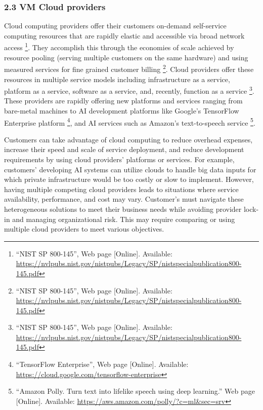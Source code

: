 \hypertarget{vm-cloud-providers}{%
\subsubsection{2.3 VM Cloud providers}\label{vm-cloud-providers}}

Cloud computing providers offer their customers on-demand self-service
computing resources that are rapidly elastic and accessible via broad
network access \footnote{``NIST SP 800-145'', Web page {[}Online{]}.
  Available:
  \url{https://nvlpubs.nist.gov/nistpubs/Legacy/SP/nistspecialpublication800-145.pdf}}.
They accomplish this through the economies of scale achieved by resource
pooling (serving multiple customers on the same hardware) and using
measured services for fine grained customer billing \footnote{``NIST SP
  800-145'', Web page {[}Online{]}. Available:
  \url{https://nvlpubs.nist.gov/nistpubs/Legacy/SP/nistspecialpublication800-145.pdf}}.
Cloud providers offer these resources in multiple service models
including infrastructure as a service, platform as a service, software
as a service, and, recently, function as a service \footnote{``NIST SP
  800-145'', Web page {[}Online{]}. Available:
  \url{https://nvlpubs.nist.gov/nistpubs/Legacy/SP/nistspecialpublication800-145.pdf}}.
These providers are rapidly offering new platforms and services ranging
from bare-metal machines to AI development platforms like Google's
TensorFlow Enterprise platform \footnote{``TensorFlow Enterprise'', Web
  page {[}Online{]}. Available:
  \url{https://cloud.google.com/tensorflow-enterprise}}, and AI services
such as Amazon's text-to-speech service \footnote{``Amazon Polly. Turn
  text into lifelike speech using deep learning.'' Web page
  {[}Online{]}. Available:
  \url{https://aws.amazon.com/polly/?c=ml\&sec=srv}}.

Customers can take advantage of cloud computing to reduce overhead
expenses, increase their speed and scale of service deployment, and
reduce development requirements by using cloud providers' platforms or
services. For example, customers' developing AI systems can utilize
clouds to handle big data inputs for which private infrastructure would
be too costly or slow to implement. However, having multiple competing
cloud providers leads to situations where service availability,
performance, and cost may vary. Customer's must navigate these
heterogeneous solutions to meet their business needs while avoiding
provider lock-in and managing organizational risk. This may require
comparing or using multiple cloud providers to meet various objectives.

